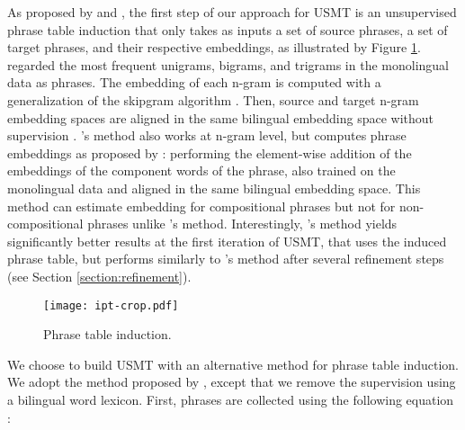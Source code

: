 \documentclass[11pt,a4paper]{article}
\begin{document}
As proposed by \citet{artetxe2018unsupervised} and \citet{DBLP:journals/corr/abs-1804-07755}, the first step of our approach for USMT is an unsupervised phrase table induction that only takes as inputs a set of source phrases, a set of target phrases, and their respective embeddings, as illustrated by Figure \ref{fig:ipt}.
\citet{artetxe2018unsupervised} regarded the most frequent unigrams, bigrams, and trigrams in the monolingual data as phrases. The embedding of each n-gram is computed with a generalization of the skipgram algorithm \citep{Mikolov:2013:DRW:2999792.2999959}. Then, source and target n-gram embedding spaces are aligned in the same bilingual embedding space without supervision \citep{P18-1073}. \citet{DBLP:journals/corr/abs-1804-07755}'s method also works at n-gram level, but computes phrase embeddings as proposed by \citet{N15-1176}: performing the element-wise addition of the embeddings of the component words of the phrase, also trained on the monolingual data and aligned in the same bilingual embedding space. This method can estimate embedding for compositional phrases but not for non-compositional phrases unlike \citet{artetxe2018unsupervised}'s method. Interestingly, \citet{artetxe2018unsupervised}'s method yields significantly better results at the first iteration of USMT, that uses the induced phrase table, but performs similarly to \citet{DBLP:journals/corr/abs-1804-07755}'s method after several refinement steps (see Section \ref{section:refinement}).

\begin{figure}[t]
    \centering
            \texttt{[image: ipt-crop.pdf]}
    \caption{\label{fig:ipt} Phrase table induction.}
\end{figure}

We choose to build USMT with an alternative method for phrase table induction. We adopt the method proposed by \citet{Marie:2018:PTI:3184403.3168054}, except that we remove the supervision using a bilingual word lexicon. First, phrases are collected using the following equation \citep{Mikolov:2013:DRW:2999792.2999959}:
\end{document}
